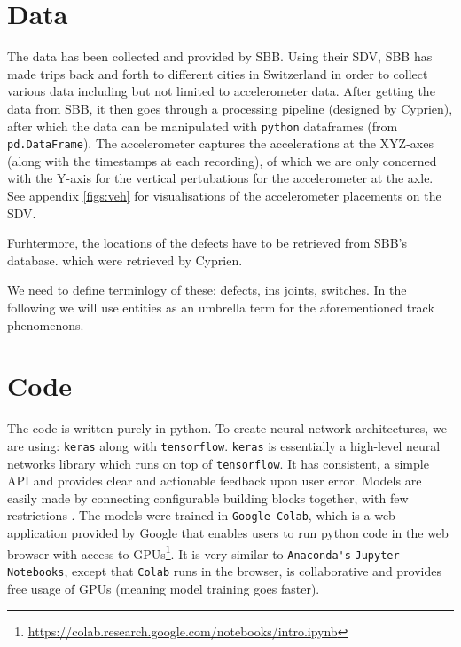 \section{Data}
The data has been collected and provided by SBB. Using their SDV, SBB has made trips back and forth to different cities in Switzerland in order to collect various data including but not limited to accelerometer data. After getting the data from SBB, it then goes through a processing pipeline (designed by Cyprien), after which the data can be manipulated with \verb|python| dataframes (from \verb|pd.DataFrame|). The accelerometer captures the accelerations at the XYZ-axes (along with the timestamps at each recording), of which we are only concerned with the Y-axis for the vertical pertubations for the accelerometer at the axle. See appendix \ref{figs:veh} for visualisations of the accelerometer placements on the SDV.


Furhtermore, the locations of the defects have to be retrieved from SBB's database. which were retrieved by Cyprien. 

We need to define terminlogy of these: defects, ins joints, switches. In the following we will use entities as an umbrella term for the aforementioned track phenomenons.

\section{Code}
The code is written purely in python. To create neural network architectures, we are using: \verb|keras| along with \verb|tensorflow|. \verb|keras| is essentially a high-level neural networks library which runs on top of \verb|tensorflow|. It has consistent, a simple API and provides clear and actionable feedback upon user error. Models are easily made by connecting configurable building blocks together, with few restrictions \cite{TensorFl31:online}. The models were trained in \verb|Google Colab|, which is a web application provided by Google that enables users to run python code in the web browser with access to GPUs\footnote{\url{https://colab.research.google.com/notebooks/intro.ipynb}}. It is very similar to \verb|Anaconda's| \verb|Jupyter Notebooks|, except that \verb|Colab| runs in the browser, is collaborative and provides free usage of GPUs (meaning model training goes faster).\\


